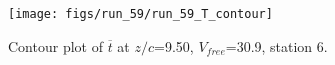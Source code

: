 \begin{figure}[H]
\centering
\texttt{[image: figs/run\_59/run\_59\_T\_contour]}
\caption{Contour plot of $\overline{t}$ at $z/c$=9.50, $V_{free}$=30.9, station 6.}
\label{fig:run_59_T_contour}
\end{figure}


